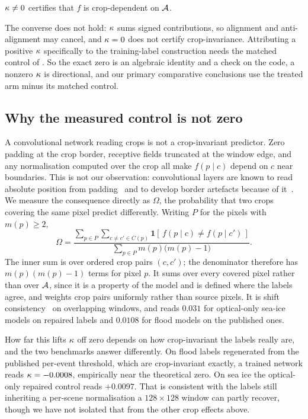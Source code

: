\begin{corollary}
\label{cor:dep}
$\kappa \neq 0$ certifies that $f$ is crop-dependent on $\mathcal{A}$.
\end{corollary}

The converse does not hold: $\kappa$ sums signed contributions, so alignment and
anti-alignment may cancel, and $\kappa = 0$ does not certify crop-invariance.
Attributing a positive $\kappa$ specifically to the training-label construction needs
the matched control of . So the exact zero is an algebraic identity
and a check on the code, a nonzero $\kappa$ is directional, and our primary comparative
conclusions use the treated arm minus its matched control.

\subsection{Why the measured control is not zero}
\label{sec:floor}

A convolutional network reading crops is not a crop-invariant predictor. Zero
padding at the crop border, receptive fields truncated at the window edge, and any
normalisation computed over the crop all make $f(p \mid c)$ depend on $c$ near
boundaries. This is not our observation: convolutional layers are known to read
absolute position from padding~\cite{kayhan2020translation, islam2020position} and to
develop border artefacts because of it~\cite{alsallakh2021mind}. We measure the
consequence directly as $\Omega$, the probability that two crops covering the
same pixel predict differently. Writing $P$ for the pixels with $m(p) \ge 2$,
\begin{equation}
\Omega = \frac{\sum_{p \in P} \sum_{c \neq c' \in C(p)}
        \mathbf{1}[\, f(p \mid c) \neq f(p \mid c') \,]}
       {\sum_{p \in P} m(p)\big(m(p) - 1\big)}.
\label{eq:omega}
\end{equation}
The inner sum is over ordered crop pairs $(c,c')$; the denominator therefore has
$m(p)(m(p)-1)$ terms for pixel $p$.
It sums over every covered pixel rather than over $\mathcal{A}$, since it is a property of
the model and is defined where the labels agree, and weights crop pairs uniformly
rather than source pixels. It is shift consistency~\cite{zhang2019shiftinvariant} on
overlapping windows, and reads $0.031$ for optical-only sea-ice models on repaired labels and
$0.0108$ for flood models on the published ones.

How far this lifts $\kappa$ off zero depends on how crop-invariant the labels really
are, and the two benchmarks answer differently. On flood labels regenerated from the
published per-event threshold, which are crop-invariant exactly, a trained network
reads $\kappa = -0.0008$, empirically near the theoretical zero. On sea ice the
optical-only repaired control reads $+0.0097$. That is consistent with the labels still
inheriting a per-scene normalisation a $128 \times 128$ window can partly
recover, though we have not isolated that from the other crop effects above.

